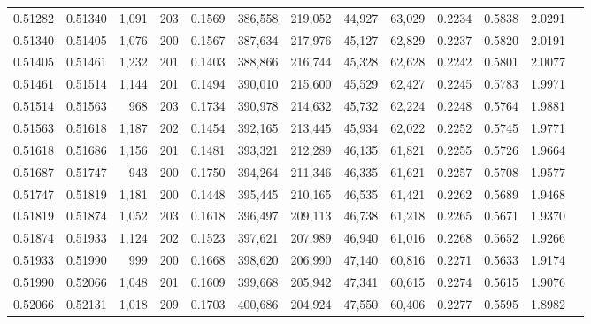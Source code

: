 \begin{tabular}{rrrrrrrrrrrrr}
0.51282 & 0.51340 & 1,091 & 203 &                                     0.1569 & 386,558 & 219,052 &  44,927 &  63,029 & 0.2234 & 0.5838 & 2.0291 \\
0.51340 & 0.51405 & 1,076 & 200 &                                     0.1567 & 387,634 & 217,976 &  45,127 &  62,829 & 0.2237 & 0.5820 & 2.0191 \\
0.51405 & 0.51461 & 1,232 & 201 &                                     0.1403 & 388,866 & 216,744 &  45,328 &  62,628 & 0.2242 & 0.5801 & 2.0077 \\
0.51461 & 0.51514 & 1,144 & 201 &                                     0.1494 & 390,010 & 215,600 &  45,529 &  62,427 & 0.2245 & 0.5783 & 1.9971 \\
0.51514 & 0.51563 &   968 & 203 &                                     0.1734 & 390,978 & 214,632 &  45,732 &  62,224 & 0.2248 & 0.5764 & 1.9881 \\
0.51563 & 0.51618 & 1,187 & 202 &                                     0.1454 & 392,165 & 213,445 &  45,934 &  62,022 & 0.2252 & 0.5745 & 1.9771 \\
0.51618 & 0.51686 & 1,156 & 201 &                                     0.1481 & 393,321 & 212,289 &  46,135 &  61,821 & 0.2255 & 0.5726 & 1.9664 \\
0.51687 & 0.51747 &   943 & 200 &                                     0.1750 & 394,264 & 211,346 &  46,335 &  61,621 & 0.2257 & 0.5708 & 1.9577 \\
0.51747 & 0.51819 & 1,181 & 200 &                                     0.1448 & 395,445 & 210,165 &  46,535 &  61,421 & 0.2262 & 0.5689 & 1.9468 \\
0.51819 & 0.51874 & 1,052 & 203 &                                     0.1618 & 396,497 & 209,113 &  46,738 &  61,218 & 0.2265 & 0.5671 & 1.9370 \\
0.51874 & 0.51933 & 1,124 & 202 &                                     0.1523 & 397,621 & 207,989 &  46,940 &  61,016 & 0.2268 & 0.5652 & 1.9266 \\
0.51933 & 0.51990 &   999 & 200 &                                     0.1668 & 398,620 & 206,990 &  47,140 &  60,816 & 0.2271 & 0.5633 & 1.9174 \\
0.51990 & 0.52066 & 1,048 & 201 &                                     0.1609 & 399,668 & 205,942 &  47,341 &  60,615 & 0.2274 & 0.5615 & 1.9076 \\
0.52066 & 0.52131 & 1,018 & 209 &                                     0.1703 & 400,686 & 204,924 &  47,550 &  60,406 & 0.2277 & 0.5595 & 1.8982 \\

\end{tabular}
